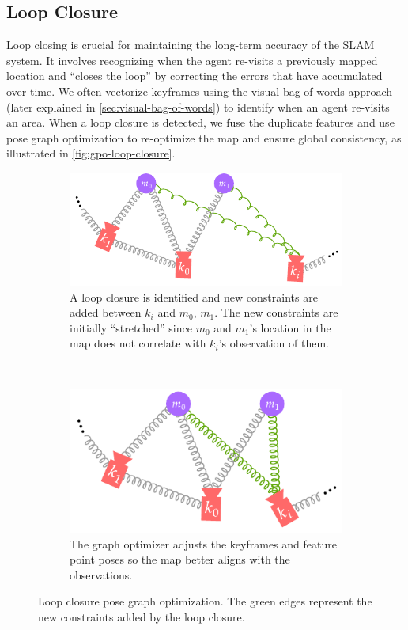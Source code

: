 \subsection{Loop Closure}
\label{sec:visual-slam-loop-closure}
Loop closing is crucial for maintaining the long-term accuracy of the SLAM system. It involves recognizing when the agent re-visits a previously mapped location and ``closes the loop'' by correcting the errors that have accumulated over time. We often vectorize keyframes using the visual bag of words approach (later explained in \autoref{sec:visual-bag-of-words}) to identify when an agent re-visits an area. When a loop closure is detected, we fuse the duplicate features and use pose graph optimization to re-optimize the map and ensure global consistency, as illustrated in \autoref{fig:gpo-loop-closure}.

\begin{figure}[h]
    \centering
    \begin{subfigure}[t]{0.54\textwidth}
        \centering
        \includegraphics[width=\textwidth]{figures/gpo_loop_closure_1.pdf}
        \caption{A loop closure is identified and new constraints are added between $k_i$ and $m_0$, $m_1$. The new constraints are initially ``stretched'' since $m_0$ and $m_1$'s location in the map does not correlate with $k_i$'s observation of them.}
    \end{subfigure}\hfill%
    ~
    \begin{subfigure}[t]{0.43\textwidth}
        \centering
        \includegraphics[width=\textwidth]{figures/gpo_loop_closure_2.pdf}
        \caption{The graph optimizer adjusts the keyframes and feature point poses so the map better aligns with the observations.}
    \end{subfigure}%
    \caption{Loop closure pose graph optimization. The green edges represent the new constraints added by the loop closure.}
    \label{fig:gpo-loop-closure}
\end{figure}


